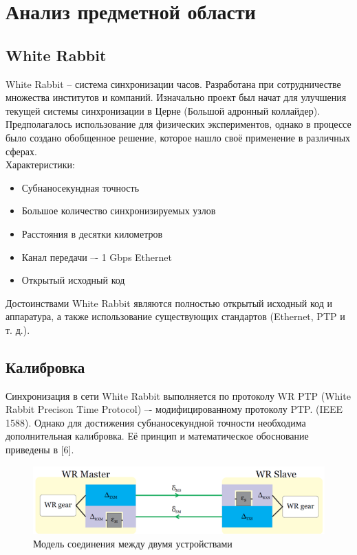 \chapter{Анализ предметной области} \label{ch1}

\section{White Rabbit} \label{ch1:sec1}

White Rabbit -- система синхронизации часов. Разработана при сотрудничестве множества
институтов и компаний. Изначально проект был начат для улучшения текущей системы синхронизации в Церне (Большой адронный коллайдер).
Предполагалось использование для физических экспериментов, однако в процессе было создано обобщенное решение,
которое нашло своё применение в различных сферах.\\

\noindent Характеристики:

\begin{itemize}
	\item Субнаносекундная точность
	\item Большое количество синхронизируемых узлов
	\item Расстояния в десятки километров
	\item Канал передачи  –- 1 Gbps Ethernet
	\item Открытый исходный код\\
\end{itemize}

Достоинствами White Rabbit являются полностью открытый исходный код и аппаратура, а также 
использование существующих стандартов (Ethernet, PTP и т. д.).

\section{Калибровка}

Синхронизация в сети White Rabbit выполняется по протоколу WR PTP (White Rabbit Precison Time Protocol) –- модифицированному протоколу PTP. (IEEE 1588).
Однако для достижения субнаносекундной точности необходима дополнительная калибровка. Её принцип и математическое обоснование приведены в [6].

\begin{figure}[ht!] 
	\center
	\includegraphics  {my_folder/images//conn_model}
	\caption{Модель соединения между двумя устройствами} 
	\label{fig:conn-model}  
\end{figure}

